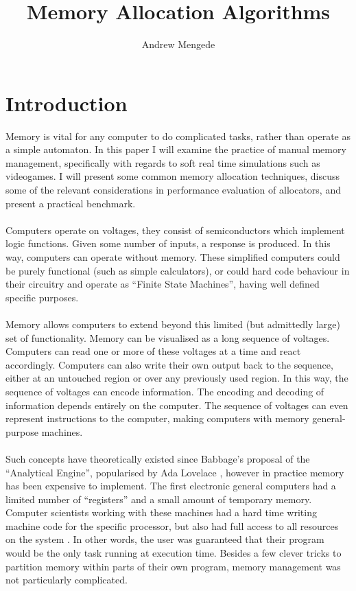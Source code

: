 \documentclass{article}
\begin{document}
\title{Memory Allocation Algorithms}
\author{Andrew Mengede}
\maketitle

\section{Introduction}
Memory is vital for any computer to do complicated tasks, rather than operate as a simple automaton. In this paper I will examine the practice of manual memory management, specifically with regards to soft real time simulations such as videogames. I will present some common memory allocation techniques, discuss some of the relevant considerations in performance evaluation of allocators, and present a practical benchmark.\\
\\
Computers operate on voltages, they consist of semiconductors which implement logic functions. Given some number of inputs, a response is produced. In this way, computers can operate without memory. These simplified computers could be purely functional (such as simple calculators), or could hard code behaviour in their circuitry and operate as ``Finite State Machines'', having well defined specific purposes.\\
\\
Memory allows computers to extend beyond this limited (but admittedly large) set of functionality. Memory can be visualised as a long sequence of voltages. Computers can read one or more of these voltages at a time and react accordingly. Computers can also write their own output back to the sequence, either at an untouched region or over any previously used region. In this way, the  sequence of voltages can encode information. The encoding and decoding of information depends entirely on the computer. The sequence of voltages can even represent instructions to the computer, making computers with memory general-purpose machines.\\
\\
Such concepts have theoretically existed since Babbage's proposal of the ``Analytical Engine'', popularised by Ada Lovelace \cite{analytical}, however in practice memory has been expensive to implement. The first electronic general computers \cite{ibmMainframes} had a limited number of ``registers'' and a small amount of temporary memory. Computer scientists working with these machines had a hard time writing machine code for the specific processor, but also had full access to all resources on the system \cite{ibmDeveloper}. In other words, the user was guaranteed that their program would be the only task running at execution time. Besides a few clever tricks to partition memory within parts of their own program, memory management was not particularly complicated.\\
\end{document}

